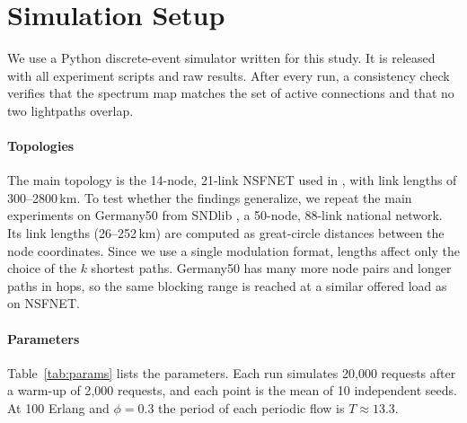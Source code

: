 \documentclass[preprint,12pt]{elsarticle}
\begin{document}
\section{Simulation Setup}\label{sec:setup}
We use a Python discrete-event simulator written for this study. It is released with all experiment scripts and raw results. After every run, a consistency check verifies that the spectrum map matches the set of active connections and that no two lightpaths overlap.

\paragraph{Topologies} The main topology is the 14-node, 21-link NSFNET used in \cite{malayeri2022}, with link lengths of 300--2800\,km. To test whether the findings generalize, we repeat the main experiments on Germany50 from SNDlib \cite{orlowski2010}, a 50-node, 88-link national network. Its link lengths (26--252\,km) are computed as great-circle distances between the node coordinates. Since we use a single modulation format, lengths affect only the choice of the $k$ shortest paths. Germany50 has many more node pairs and longer paths in hops, so the same blocking range is reached at a similar offered load as on NSFNET.

\paragraph{Parameters} Table~\ref{tab:params} lists the parameters. Each run simulates 20{,}000 requests after a warm-up of 2{,}000 requests, and each point is the mean of 10 independent seeds. At 100 Erlang and $\phi=0.3$ the period of each periodic flow is $T\approx13.3$.
\end{document}
